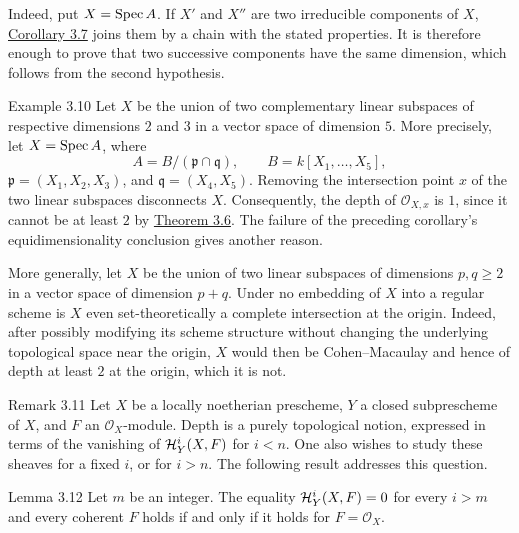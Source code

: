 Indeed, put $X=\operatorname{Spec} A$. If $X'$ and $X''$ are two irreducible components of
$X$, \hyperref[III.3.7]{Corollary 3.7} joins them by a chain with the stated properties. It is
therefore enough to prove that two successive components have the same
dimension, which follows from the second hypothesis.


\begin{sgastatement}{Example 3.10}
Let $X$ be the union of two complementary linear subspaces of respective
dimensions $2$ and $3$ in a vector space of dimension $5$. More precisely,
let $X=\operatorname{Spec} A$, where
\[
  A=B/(\mathfrak p\cap\mathfrak q),\qquad
  B=k[X_1,\ldots,X_5],
\]
$\mathfrak p=(X_1,X_2,X_3)$, and $\mathfrak q=(X_4,X_5)$. Removing the
intersection point $x$ of the two linear subspaces disconnects $X$.
Consequently, the depth of $\mathcal O_{X,x}$ is $1$, since it cannot be at
least $2$ by \hyperref[III.3.6]{Theorem 3.6}. The failure of the preceding corollary's
equidimensionality conclusion gives another reason.

More generally, let $X$ be the union of two linear subspaces of dimensions
$p,q\ge2$ in a vector space of dimension $p+q$. Under no embedding of $X$
into a regular scheme is $X$ even set-theoretically a complete intersection
at the origin. Indeed, after possibly modifying its scheme structure without
changing the underlying topological space near the origin, $X$ would then be
Cohen--Macaulay and hence of depth at least $2$ at the origin, which it is not.
\end{sgastatement}

\begin{sgastatement}{Remark 3.11}
Let $X$ be a locally noetherian prescheme, $Y$ a closed subprescheme of $X$,
and $F$ an $\mathcal O_X$-module. Depth is a purely topological notion,
expressed in terms of the vanishing of $\mathcal H_Y^i(X,F)$ for $i<n$. One also
wishes to study these sheaves for a fixed $i$, or for $i>n$. The following
result addresses this question.
\end{sgastatement}


\begin{sgastatement}{Lemma 3.12}
Let $m$ be an integer. The equality $\mathcal H_Y^i(X,F)=0$ for every $i>m$ and
every coherent $F$ holds if and only if it holds for $F=\mathcal O_X$.
\end{sgastatement}

